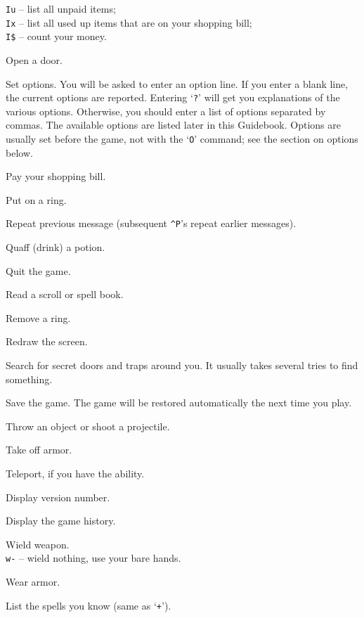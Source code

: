 {\tt Iu} -- list all unpaid items;\\
{\tt Ix} -- list all used up items that are on your shopping bill;\\
{\tt I\$} -- count your money.
\item[\tb{o}]
Open a door.
\item[\tb{O}]
Set options.  You will be asked to enter an option line.  If you enter
a blank line, the current options are reported.  Entering `{\tt ?}' will
get you explanations of the various options.  Otherwise, you should
enter a list of options separated by commas.  The available options
are listed later in this Guidebook.  Options are usually set before
the game, not with the `{\tt O}' command; see the section on options below.
\item[\tb{p}]
Pay your shopping bill.
\item[\tb{P}]
Put on a ring.
\item[\tb{\^{}P}]
Repeat previous message (subsequent {\tt \^{}P}'s repeat earlier messages).
\item[\tb{q}]
Quaff (drink) a potion.
\item[\tb{Q}]
Quit the game.
\item[\tb{r}]
Read a scroll or spell book.
\item[\tb{R}]
Remove a ring.
\item[\tb{\^{}R}]
Redraw the screen.
\item[\tb{s}]
Search for secret doors and traps around you.  It usually takes several
tries to find something.
\item[\tb{S}]
Save the game.  The game will be restored automatically the next time
you play.
\item[\tb{t}]
Throw an object or shoot a projectile.
\item[\tb{T}]
Take off armor.
\item[\tb{\^{}T}]
Teleport, if you have the ability.
\item[\tb{v}]
Display version number.
\item[\tb{V}]
Display the game history.
\item[\tb{w}]
Wield weapon.\\
{\tt w-} -- wield nothing, use your bare hands.
\item[\tb{W}]
Wear armor.
\item[\tb{x}]
List the spells you know (same as `{\tt +}').
\item[\tb{X}]
